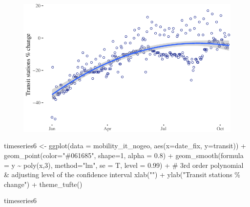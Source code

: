 \documentclass[
  letterpaper,
  DIV=11,
  numbers=noendperiod]{scrreprt}
\newenvironment{Shaded}{\begin{snugshade}}{\end{snugshade}}
\newcommand{\AttributeTok}[1]{\textcolor[rgb]{0.40,0.45,0.13}{#1}}
\newcommand{\CommentTok}[1]{\textcolor[rgb]{0.37,0.37,0.37}{#1}}
\newcommand{\DecValTok}[1]{\textcolor[rgb]{0.68,0.00,0.00}{#1}}
\newcommand{\FloatTok}[1]{\textcolor[rgb]{0.68,0.00,0.00}{#1}}
\newcommand{\FunctionTok}[1]{\textcolor[rgb]{0.28,0.35,0.67}{#1}}
\newcommand{\NormalTok}[1]{\textcolor[rgb]{0.00,0.23,0.31}{#1}}
\newcommand{\OtherTok}[1]{\textcolor[rgb]{0.00,0.23,0.31}{#1}}
\newcommand{\SpecialCharTok}[1]{\textcolor[rgb]{0.37,0.37,0.37}{#1}}
\newcommand{\StringTok}[1]{\textcolor[rgb]{0.13,0.47,0.30}{#1}}
\begin{document}
\begin{figure}[H]

{\centering \includegraphics{longitudinal-1_files/figure-pdf/unnamed-chunk-14-1.pdf}

}

\end{figure}

\begin{Shaded}
\begin{Highlighting}[]
\NormalTok{timeseries6 }\OtherTok{\textless{}{-}} \FunctionTok{ggplot}\NormalTok{(}\AttributeTok{data =}\NormalTok{ mobility\_it\_nogeo, }\FunctionTok{aes}\NormalTok{(}\AttributeTok{x=}\NormalTok{date\_fix, }\AttributeTok{y=}\NormalTok{transit)) }\SpecialCharTok{+}
  \FunctionTok{geom\_point}\NormalTok{(}\AttributeTok{color=}\StringTok{"\#061685"}\NormalTok{, }\AttributeTok{shape=}\DecValTok{1}\NormalTok{, }\AttributeTok{alpha =} \FloatTok{0.8}\NormalTok{) }\SpecialCharTok{+} 
  \FunctionTok{geom\_smooth}\NormalTok{(}\AttributeTok{formula =}\NormalTok{ y }\SpecialCharTok{\textasciitilde{}} \FunctionTok{poly}\NormalTok{(x,}\DecValTok{3}\NormalTok{), }\AttributeTok{method=}\StringTok{"lm"}\NormalTok{, }\AttributeTok{se =}\NormalTok{ T, }\AttributeTok{level =} \FloatTok{0.99}\NormalTok{) }\SpecialCharTok{+} \CommentTok{\# 3rd order polynomial \& adjusting level of the confidence interval}
  \FunctionTok{xlab}\NormalTok{(}\StringTok{""}\NormalTok{) }\SpecialCharTok{+}
  \FunctionTok{ylab}\NormalTok{(}\StringTok{"Transit stations \% change"}\NormalTok{) }\SpecialCharTok{+}
 \FunctionTok{theme\_tufte}\NormalTok{() }
  
\NormalTok{timeseries6}
\end{Highlighting}
\end{Shaded}
\end{document}
